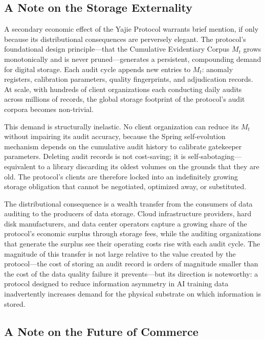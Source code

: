 \documentclass[12pt,a4paper]{ctexart}
\theoremstyle{definition}
\theoremstyle{remark}
\begin{document}
\subsection{A Note on the Storage Externality}

A secondary economic effect of the Yajie Protocol warrants brief mention, if only because its distributional consequences are perversely elegant. The protocol's foundational design principle—that the Cumulative Evidentiary Corpus $M_t$ grows monotonically and is never pruned—generates a persistent, compounding demand for digital storage. Each audit cycle appends new entries to $M_t$: anomaly registers, calibration parameters, quality fingerprints, and adjudication records. At scale, with hundreds of client organizations each conducting daily audits across millions of records, the global storage footprint of the protocol's audit corpora becomes non-trivial.

This demand is structurally inelastic. No client organization can reduce its $M_t$ without impairing its audit accuracy, because the Spring self-evolution mechanism depends on the cumulative audit history to calibrate gatekeeper parameters. Deleting audit records is not cost-saving; it is self-sabotaging—equivalent to a library discarding its oldest volumes on the grounds that they are old. The protocol's clients are therefore locked into an indefinitely growing storage obligation that cannot be negotiated, optimized away, or substituted.

The distributional consequence is a wealth transfer from the consumers of data auditing to the producers of data storage. Cloud infrastructure providers, hard disk manufacturers, and data center operators capture a growing share of the protocol's economic surplus through storage fees, while the auditing organizations that generate the surplus see their operating costs rise with each audit cycle. The magnitude of this transfer is not large relative to the value created by the protocol—the cost of storing an audit record is orders of magnitude smaller than the cost of the data quality failure it prevents—but its direction is noteworthy: a protocol designed to reduce information asymmetry in AI training data inadvertently increases demand for the physical substrate on which information is stored.

\subsection{A Note on the Future of Commerce}
\end{document}
